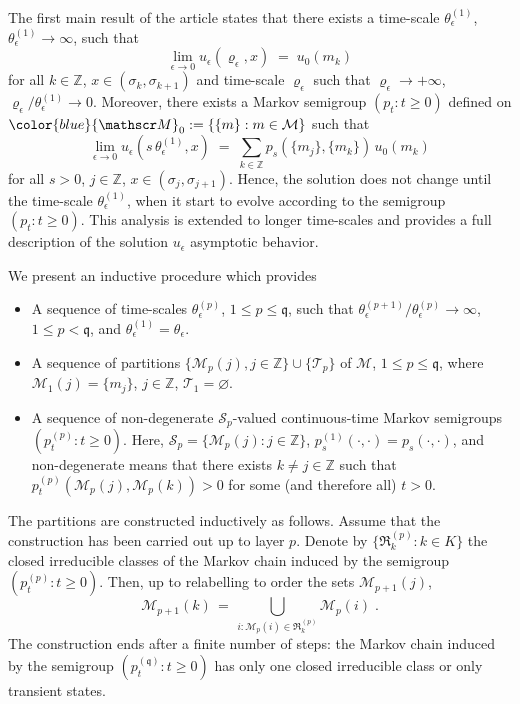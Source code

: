 \documentclass[reqno]{amsart}
\theoremstyle{plain}
\theoremstyle{definition}
\newcommand{\mc}[1]{{\mathcal #1}}
\newcommand{\mf}[1]{{\mathfrak #1}}
\newcommand{\bb}[1]{{\mathbb #1}}
\newcommand{\ms}[1]{{\mathscr #1}}
\newcounter{as}[section]
\newcommand{\<}{\langle}
\renewcommand{\>}{\rangle}
\begin{document}
The first main result of the article states that there exists a time-scale
$\theta^{(1)}_{\epsilon}$, $\theta^{(1)}_{\epsilon} \to \infty$, such that
\begin{equation*}
\lim_{\epsilon\to0}
u_{\epsilon}(\varrho_{\epsilon}, x)\;=\;
u_{0}(m_k) 
\end{equation*}
for all $k\in \bb Z$, $x \in (\sigma_k, \sigma_{k+1})$ and time-scale
$\varrho_{\epsilon}$ such that $\varrho_{\epsilon} \to +\infty$,
$\varrho_{\epsilon} / \theta^{(1)}_{\epsilon} \to 0$. Moreover, there
exists a Markov semigroup $(p_{t}:t\ge0)$ defined on
${\color{blue} \ms {M}_{0}} := \{\{m\}: m\in \mc M\}$ such that
\begin{equation*}
\lim_{\epsilon\to0}u_{\epsilon}(s\, \theta^{(1)}_{\epsilon}, x)
\;=\;\sum_{k\in \bb Z}
p_{s}(\{m_j\}, \{m_k\})\, u_{0}(m_k)
\end{equation*}
for all $s>0$, $j\in \bb Z$, $x \in (\sigma_j, \sigma_{j+1})$.  Hence,
the solution does not change until the time-scale
$\theta^{(1)}_{\epsilon}$, when it start to evolve according to the
semigroup $(p_t: t\ge 0)$.  This analysis is extended to longer
time-scales and provides a full description of the solution
$u_\epsilon$ asymptotic behavior.


We present an inductive procedure which provides

\begin{itemize}
\item[(a)] A sequence of time-scales $\theta^{(p)}_{\epsilon}$,
$1\le p\le \mf q$, such that
$\theta^{(p+1)}_{\epsilon} / \theta^{(p)}_{\epsilon} \to \infty$,
$1\le p <\mf q$, and $\theta^{(1)}_\epsilon = \theta_\epsilon$.

\item[(b)] A sequence of partitions
$\{\ms M_p(j), j \in \bb Z\} \cup \{\ms T_p\}$ of $\mc M$,
$1\le p\le \mf q$, where $\ms M_1(j) = \{m_j\}$, $j\in \bb Z$,
$\ms T_1= \varnothing$.

\item[(c)] A sequence of non-degenerate $\ms S_p$-valued
continuous-time Markov semigroups $(p^{(p)}_t : t\ge 0)$. Here,
$\ms S_p = \{\ms M_p(j): j\in \bb Z\}$,
$p^{(1)}_{s}(\cdot, \cdot) = p_{s}(\cdot, \cdot)$, and non-degenerate
means that there exists $k\neq j\in \bb Z$ such that
$p^{(p)}_t(\ms M_p(j), \ms M_p(k))>0$ for some (and therefore all)
$t>0$.
\end{itemize}

The partitions are constructed inductively as follows. Assume that the
construction has been carried out up to layer $p$. Denote by
$\{\mf R^{(p)}_k : k\in K\}$ the closed irreducible classes of the
Markov chain induced by the semigroup $(p^{(p)}_t : t\ge 0)$. Then, up
to relabelling to order the sets $\ms M_{p+1}(j)$,
\begin{equation*}
\ms M_{p+1}(k) \,=\, \bigcup_{i: \ms M_{p}(i) \in \mf R^{(p)}_k} \ms
M_p(i)\;. 
\end{equation*}
The construction ends after a finite number of steps: the Markov chain
induced by the semigroup $(p^{(\mf q)}_t : t\ge 0)$ has only one closed
irreducible class or only transient states.
\end{document}
